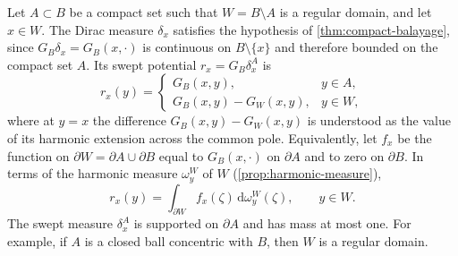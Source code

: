 \begin{example}\label{ex:balayage-harmonic-measure}
Let $A\subset B$ be a compact set such that $W=B\setminus A$ is a regular domain, and let $x\in W$. The Dirac measure $\delta_x$ satisfies the hypothesis of \cref{thm:compact-balayage}, since $G_B\delta_x=G_B(x,\cdot)$ is continuous on $B\setminus\{x\}$ and therefore bounded on the compact set $A$. Its swept potential $r_x=G_B\delta_x^A$ is
\[
 r_x(y)=
 \begin{cases}
 G_B(x,y),&y\in A,\\
 G_B(x,y)-G_W(x,y),&y\in W,
 \end{cases}
\]
where at $y=x$ the difference $G_B(x,y)-G_W(x,y)$ is understood as the value of its harmonic extension across the common pole. Equivalently, let $f_x$ be the function on $\partial W=\partial A\cup\partial B$ equal to $G_B(x,\cdot)$ on $\partial A$ and to zero on $\partial B$. In terms of the harmonic measure $\omega_y^W$ of $W$ (\cref{prop:harmonic-measure}),
\[
 r_x(y)=\int_{\partial W}f_x(\zeta)\,\mathrm d\omega_y^W(\zeta),\qquad y\in W.
\]
The swept measure $\delta_x^A$ is supported on $\partial A$ and has mass at most one. For example, if $A$ is a closed ball concentric with $B$, then $W$ is a regular domain.
\end{example}

